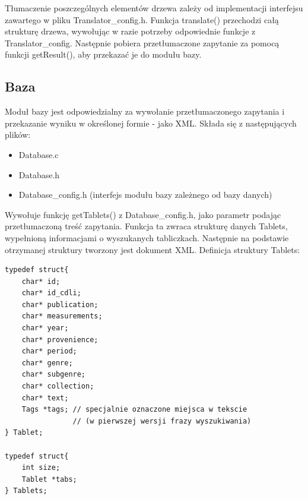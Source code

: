 \documentclass{pracamgr}
\begin{document}
Tłumaczenie poszczególnych elementów drzewa zależy od implementacji interfejsu zawartego w pliku Translator\_config.h. 
Funkcja translate() przechodzi całą strukturę drzewa, wywołując w razie potrzeby odpowiednie funkcje z Translator\_config.
Następnie pobiera przetłumaczone zapytanie za pomocą funkcji getResult(), aby przekazać je do modułu bazy.

\subsection{Baza}
Moduł bazy jest odpowiedzialny za wywołanie przetłumaczonego zapytania i przekazanie wyniku w określonej formie - jako XML.
Składa się z następujących plików:
\begin {itemize}
 \item Database.c
 \item Database.h
 \item Database\_config.h (interfejs modułu bazy zależnego od bazy danych)
\end {itemize}

Wywołuje funkcję getTablets() z Database\_config.h, jako parametr podając przetłumaczoną treść zapytania. 
Funkcja ta zwraca strukturę danych Tablets, wypełnioną informacjami o wyszukanych tabliczkach.
Następnie na podstawie otrzymanej struktury tworzony jest dokument XML.
\newline
Definicja struktury Tablets:
\begin{verbatim}
typedef struct{    
    char* id;
    char* id_cdli;
    char* publication;
    char* measurements;
    char* year;
    char* provenience;
    char* period;
    char* genre;
    char* subgenre;
    char* collection;
    char* text;
    Tags *tags; // specjalnie oznaczone miejsca w tekscie
                // (w pierwszej wersji frazy wyszukiwania)
} Tablet;

typedef struct{
    int size;
    Tablet *tabs;
} Tablets;
\end{verbatim}


\end{document}
